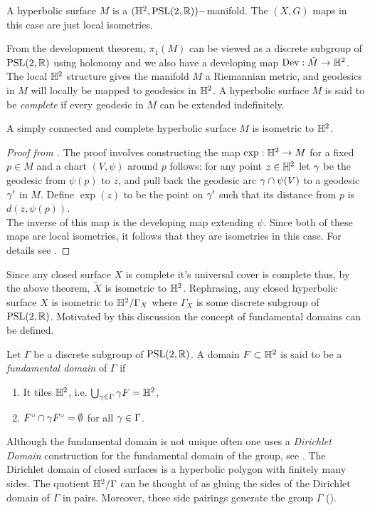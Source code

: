 \begin{definition}
  A hyperbolic surface $M$ is a $(\mathbb{H}^2, \text{PSL}(2,\mathbb{R}))-$manifold. The $(X,G)$ maps in this case are just local isometries.
\end{definition}
From the development theorem, $\pi_1(M)$ can be viewed as a discrete subgroup of $\text{PSL}(2,\mathbb{R})$ using holonomy and we also have a developing map $\text{Dev}:\tilde{M}\to \mathbb{H}^2$. The local $\mathbb{H}^2$ structure gives the manifold $M$ a Riemannian metric, and geodesics in $M$ will locally be mapped to geodesics in $\mathbb{H}^2$. A hyperbolic surface $M$ is said to be \textit{complete} if every geodesic in $M$ can be extended indefinitely. 
\begin{theorem}
  A simply connected and complete hyperbolic surface $M$ is isometric to $\mathbb{H}^2$.
\end{theorem}
\begin{proof}[Proof from \cite{casson}]
  The proof involves constructing the map $\exp:\mathbb{H}^2\to M$ for a fixed $p\in M$ and a chart $(V,\psi)$ around $p$ follows: for any point $z\in\mathbb{H}^2$ let $\gamma$ be the geodesic from $\psi(p)$ to $z$, and pull back the geodesic arc $\gamma\cap \psi(V)$ to a geodesic $\gamma'$ in $M$. Define $\exp(z)$ to be the point on $\gamma'$ such that its distance from $p$ is $d(z,\psi(p))$.\\
  The inverse of this map is the developing map extending $\psi$. Since both of these maps are local isometries, it follows that they are isometries in this case. For details see \cite{casson}.
\end{proof}
Since any closed surface $X$ is complete it's universal cover is complete thus, by the above theorem, $\tilde{X}$ is isometric to $\mathbb{H}^2$. Rephrasing, any closed hyperbolic surface $X$ is isometric to $\mathbb{H}^2/\Gamma_X$ where $\Gamma_X$ is some discrete subgroup of $\text{PSL}(2,\mathbb{R})$. Motivated by this discussion the concept of fundamental domains can be defined.
\begin{definition}
  Let $\Gamma$ be a discrete subgroup of $\text{PSL}(2,\mathbb{R})$. A domain $F\subset \mathbb{H}^2$ is said to be a \textit{fundamental domain} of $\Gamma$ if
  \begin{enumerate}
    \item It tiles $\mathbb{H}^2$, i.e. $\bigcup_{\gamma\in \Gamma} \gamma F = \mathbb{H}^2$,
    \item $F^\circ \cap \gamma F^\circ = \emptyset$ for all $\gamma\in \Gamma$.
  \end{enumerate}
\end{definition}
Although the fundamental domain is not unique often one uses a \textit{Dirichlet Domain} construction for the fundamental domain of the group, see \cite{katok}. The Dirichlet domain of closed surfaces is a hyperbolic polygon with finitely many sides. The quotient $\mathbb{H}^2/\Gamma$ can be thought of as gluing the sides of the Dirichlet domain of $\Gamma$ in pairs. Moreover, these side pairings generate the group $\Gamma$ (\cite{katok}).\\ 

